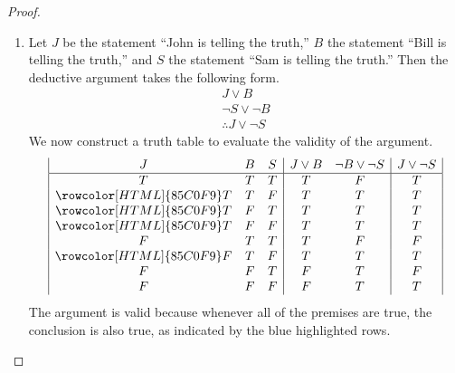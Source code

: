 \documentclass[12pt]{amsart}
\theoremstyle{definition}
\theoremstyle{remark}
\begin{document}
\begin{proof}
\begin{enumerate}
	\item Let $J$ be the statement ``John is telling the truth,'' $B$ the statement ``Bill is telling the truth,'' and $S$ the statement ``Sam is telling the truth.''
	Then the deductive argument takes the following form.
	\begin{equation*}
		\begin{array}{l}
			J \vee B \\
			\neg S \vee \neg B \\
			\hline
			\therefore J \vee \neg S
		\end{array}
	\end{equation*}
	We now construct a truth table to evaluate the validity of the argument.
	\begin{equation*}
		\begin{array}{| c c c | c c | c |}
			J & B & S & J \vee B & \neg B \vee \neg S & J \vee \neg S \\
			\hline
			T & T & T & T & F & T \\
			\rowcolor[HTML]{85C0F9} T & T & F & T & T & T \\
			\rowcolor[HTML]{85C0F9} T & F & T & T & T & T \\
			\rowcolor[HTML]{85C0F9} T & F & F & T & T & T \\
			F & T & T & T & F & F \\
			\rowcolor[HTML]{85C0F9} F & T & F & T & T & T \\
			F & F & T & F & T & F \\
			F & F & F & F & T & T
		\end{array}
	\end{equation*}
	The argument is valid because whenever all of the premises are true, the conclusion is also true, as indicated by the blue highlighted rows.
	

\end{enumerate}
\end{proof}
\end{document}
